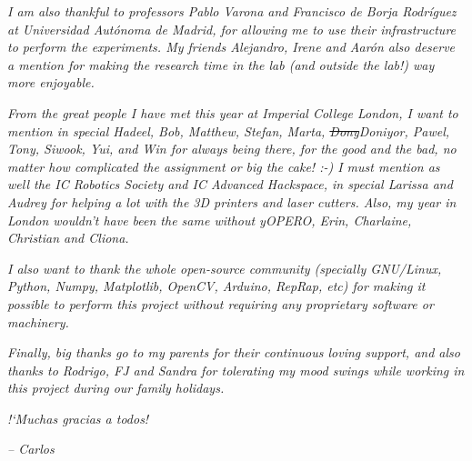 \documentclass[12pt,twoside]{report}
\begin{document}
\emph{I am also thankful to professors Pablo Varona and Francisco de Borja Rodr\'iguez at Universidad Aut\'onoma de Madrid, for allowing me to use their infrastructure to perform the experiments. My friends Alejandro, Irene and Aar\'on also deserve a mention for making the research time in the lab (and outside the lab!) way more enjoyable.}

\emph{From the great people I have met this year at Imperial College London, I want to mention in special Hadeel, Bob, Matthew, Stefan, Marta, \sout{Dony}Doniyor, Pawel, Tony, Siwook, Yui, and Win for always being there, for the good and the bad, no matter how complicated the assignment or big the cake! :-)
I must mention as well the IC Robotics Society and IC Advanced Hackspace, in special Larissa and Audrey for helping a lot with the 3D printers and laser cutters.
Also, my year in London wouldn't have been the same without yOPERO, Erin, Charlaine, Christian and Cliona.}

\emph{I also want to thank the whole open-source community (specially GNU/Linux, Python, Numpy, Matplotlib, OpenCV, Arduino, RepRap, etc) for making it possible to perform this project without requiring any proprietary software or machinery.}

\emph{Finally, big thanks go to my parents for their continuous loving support, and also thanks to Rodrigo, FJ and Sandra for tolerating my mood swings while working in this project during our family holidays.}

\emph{!`Muchas gracias a todos!}

\emph{-- Carlos}



\clearpage{\pagestyle{empty}\cleardoublepage}

\fancyhead[LE,RO]{\slshape}


	
\begin{spacing}{0.1}
\tableofcontents 
\end{spacing}

\clearpage{\pagestyle{empty}\cleardoublepage}


\begin{spacing}{0.1}
\listoffigures
\end{spacing}


\clearpage{\pagestyle{empty}\cleardoublepage}
\setcounter{page}{1}
\end{document}
